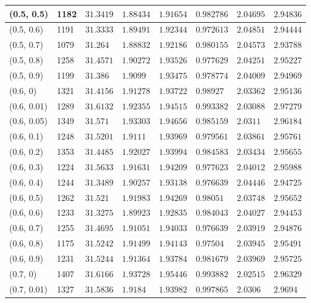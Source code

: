 \begin{center}
{\begin{longtable}{| l | p{} |  p{} | p{} | p{} | p{} | p{} | p{} |}
 (0.5, 0.5) & 1182  & $31.3419$ & $1.88434$ & $1.91654$ & $0.982786$ & $2.04695$ & $2.94836$ \\ \hline
 (0.5, 0.6) & 1191  & $31.3333$ & $1.89491$ & $1.92344$ & $0.972613$ & $2.04851$ & $2.94444$ \\ \hline
 (0.5, 0.7) & 1079  & $31.264$ & $1.88832$ & $1.92186$ & $0.980155$ & $2.04573$ & $2.93788$ \\ \hline
 (0.5, 0.8) & 1258  & $31.4571$ & $1.90272$ & $1.93526$ & $0.977629$ & $2.04251$ & $2.95227$ \\ \hline
 (0.5, 0.9) & 1199  & $31.386$ & $1.9099$ & $1.93475$ & $0.978774$ & $2.04009$ & $2.94969$ \\ \hline
 (0.6, 0) & 1321  & $31.4156$ & $1.91278$ & $1.93722$ & $0.98927$ & $2.03362$ & $2.95136$ \\ \hline
 (0.6, 0.01) & 1289  & $31.6132$ & $1.92355$ & $1.94515$ & $0.993382$ & $2.03088$ & $2.97279$ \\ \hline
 (0.6, 0.05) & 1349  & $31.571$ & $1.93303$ & $1.94656$ & $0.985159$ & $2.0311$ & $2.96184$ \\ \hline
 (0.6, 0.1) & 1248  & $31.5201$ & $1.9111$ & $1.93969$ & $0.979561$ & $2.03861$ & $2.95761$ \\ \hline
 (0.6, 0.2) & 1353  & $31.4485$ & $1.92027$ & $1.93994$ & $0.984583$ & $2.03434$ & $2.95655$ \\ \hline
 (0.6, 0.3) & 1224  & $31.5633$ & $1.91631$ & $1.94209$ & $0.977623$ & $2.04012$ & $2.95988$ \\ \hline
 (0.6, 0.4) & 1244  & $31.3489$ & $1.90257$ & $1.93138$ & $0.976639$ & $2.04446$ & $2.94725$ \\ \hline
 (0.6, 0.5) & 1262  & $31.521$ & $1.91983$ & $1.94269$ & $0.98051$ & $2.03748$ & $2.95652$ \\ \hline
 (0.6, 0.6) & 1233  & $31.3275$ & $1.89923$ & $1.92835$ & $0.984043$ & $2.04027$ & $2.94453$ \\ \hline
 (0.6, 0.7) & 1255  & $31.4695$ & $1.91051$ & $1.94033$ & $0.976639$ & $2.03919$ & $2.94876$ \\ \hline
 (0.6, 0.8) & 1175  & $31.5242$ & $1.91499$ & $1.94143$ & $0.97504$ & $2.03945$ & $2.95491$ \\ \hline
 (0.6, 0.9) & 1231  & $31.5244$ & $1.91364$ & $1.93784$ & $0.981679$ & $2.03969$ & $2.95725$ \\ \hline
 (0.7, 0) & 1407  & $31.6166$ & $1.93728$ & $1.95446$ & $0.993882$ & $2.02515$ & $2.96329$ \\ \hline
 (0.7, 0.01) & 1327  & $31.5836$ & $1.9184$ & $1.93982$ & $0.997865$ & $2.0306$ & $2.9694$ \\ \hline

\end{longtable}}
\end{center}
